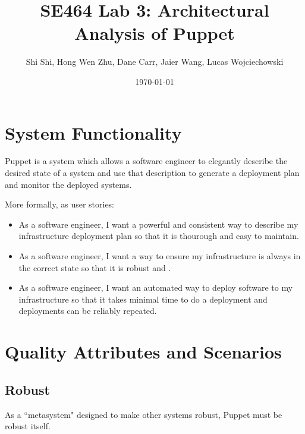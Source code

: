 \documentclass[a4paper]{article}
\title{SE464 Lab 3: Architectural Analysis of Puppet}
\author{Shi Shi, Hong Wen Zhu, Dane Carr, Jaier Wang, Lucas Wojciechowski}
\date{\today}
\begin{document}
\maketitle

\section{System  Functionality} %


Puppet is a system which allows a software engineer to elegantly describe the desired state of a system and use that description to generate a deployment plan and monitor the deployed systems.

More formally, as user stories:
\begin{itemize}
\item As a software engineer, I want a powerful and consistent way to describe my infrastructure deployment plan so that it is thourough and easy to maintain.
\item As a software engineer, I want a way to ensure my infrastructure is always in the correct state so that it is robust and .
\item As a software engineer, I want an automated way to deploy software to my infrastructure so that it takes minimal time to do a deployment and deployments can be reliably repeated.
\end{itemize}

\section{Quality Attributes and Scenarios} %


\subsection{Robust}

As a ``metasystem" designed to make other systems robust, Puppet must be robust itself.
\end{document}
